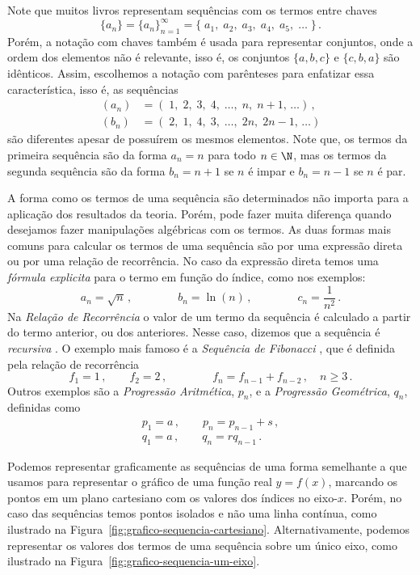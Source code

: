 Note que muitos livros representam sequências com os termos entre chaves
\[
  \{a_n\}
  = \{a_n\}_{n=1}^\infty
  = \{\; a_1, \; a_2, \; a_3, \; a_4, \; a_5, \; \dots\;\}     \,.
\]
Porém, a notação com chaves também é usada para representar conjuntos, onde a ordem dos
elementos não é relevante, isso é, os conjuntos \(\{a,b,c\}\) e \(\{c,b,a\}\) são idênticos.
Assim, escolhemos a notação com parênteses para enfatizar essa característica, isso é,
as sequências
\begin{align*}
  (a_n) & = (\; 1, \; 2, \; 3, \; 4, \; \dots, \; n,  \; n+1,  \, \dots ) \,,\\
  (b_n) & = (\; 2, \; 1, \; 4, \; 3, \; \dots, \; 2n, \; 2n-1, \, \dots )
\end{align*}
são diferentes apesar de possuírem os mesmos elementos.
Note que, os termos da primeira sequência são da forma $a_n=n$ para todo $n\in\N$,
mas os termos da segunda sequência são da forma $b_n=n+1$ se $n$ é impar e $b_n=n-1$ se $n$ é par.

A forma como os termos de uma sequência são determinados não importa
para a aplicação dos resultados da teoria. Porém, pode fazer muita diferença
quando desejamos fazer manipulações algébricas com os termos.
As duas formas mais comuns para calcular os termos de uma sequência são
por uma expressão direta ou por uma relação de recorrência.
No caso da expressão direta temos uma \emph{fórmula explicita} para o
termo em função do índice, como nos exemplos:
\[
  a_n = \sqrt{n}    \,,
  \qquad\qquad
  b_n = \ln(n)    \,,
  \qquad\qquad
  c_n = \frac{1}{n^2}    \,.
\]
Na
\emph{Relação de Recorrência}%
o valor de um termo da sequência é calculado a partir do termo anterior, ou dos anteriores.
Nesse caso, dizemos que a sequência é
\emph{recursiva}%
.
O exemplo mais famoso é a
\emph{Sequência de Fibonacci}%
%
,
que é definida pela relação de recorrência
\[
  f_1 = 1    \,, \qquad
  f_2 = 2    \,, \qquad\qquad
  f_n = f_{n-1} + f_{n-2} \,, \quad n \geq 3    \,.
\]
Outros exemplos são a
\emph{Progressão Aritmética}, $p_n$, e a
\emph{Progressão Geométrica}, $q_n$, definidas como
\begin{gather*}
  p_1 = a    \,, \qquad p_n = p_{n-1} + s     \,, \\
  q_1 = a    \,, \qquad q_n = r q_{n-1}       \,.
\end{gather*}

Podemos representar graficamente as sequências de uma forma semelhante a
que usamos para representar o gráfico de uma função real $y=f(x)$, marcando
os pontos em um plano cartesiano com os valores dos índices no eixo-$x$.
Porém, no caso das sequências temos pontos isolados e não uma linha contínua,
como ilustrado na Figura~\ref{fig:grafico-sequencia-cartesiano}.
Alternativamente, podemos representar os valores dos termos de uma sequência
sobre um único eixo, como ilustrado na Figura~\ref{fig:grafico-sequencia-um-eixo}.

